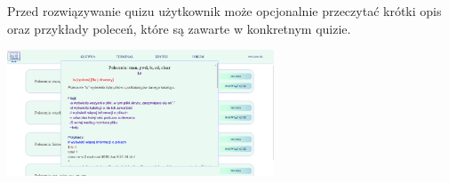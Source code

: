 \documentclass[10pt,a4paper]{report}
\begin{document}
\begin{adjustwidth}{2cm}{2cm}
\begin{minipage}{1\linewidth}
\vspace{0.3cm}
Przed rozwiązywanie quizu użytkownik może opcjonalnie przeczytać krótki opis oraz przykłady poleceń, które są zawarte w konkretnym quizie.\\
\end{minipage}
\begin{minipage}{\linewidth}
\begin{center}
  \includegraphics[width=300px]{project/teoria.png}
\end{center}
\end{minipage}

\end{adjustwidth}
\end{document}
